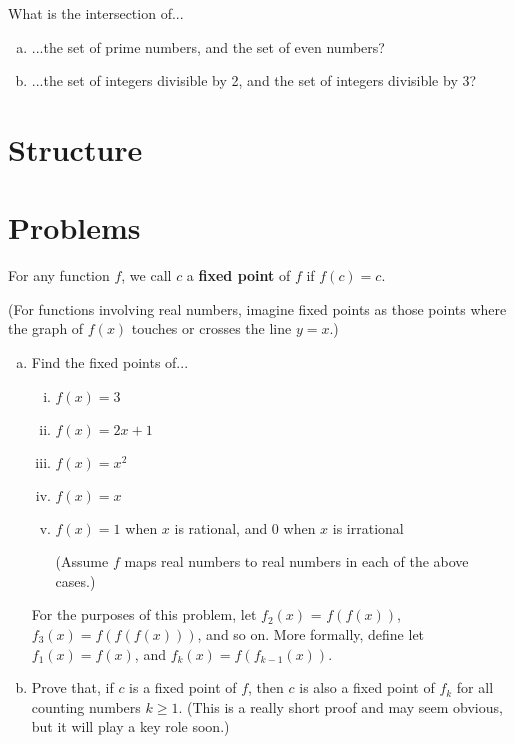 \begin{exercise}
What is the intersection of...
\begin{enumerate}[(a)]
\item ...the set of prime numbers, and the set of even numbers?
\item ...the set of integers divisible by 2, and the set of integers divisible by 3?
\end{enumerate}
\end{exercise}




\section{Structure}



\section{Problems}


\begin{problem}
\label{pr:fp-intro}
For any function $f$, we call $c$ a \textbf{fixed point} of $f$ if $f(c) = c$. 

(For functions involving real numbers, imagine fixed points as those points where the graph of $f(x)$ touches or crosses the line $y = x$.)


\begin{enumerate}[(a)]
\item Find the fixed points of... 
\begin{enumerate}[i.]
\item $f(x) = 3$
\item $f(x) = 2x + 1$
\item $f(x) = x^2$
\item $f(x) = x$
\item $f(x) = 1$ when $x$ is rational, and 0 when $x$ is irrational

(Assume $f$ maps real numbers to real numbers in each of the above cases.)
\end{enumerate}

For the purposes of this problem, let $f_2(x)$ = $f(f(x))$, $f_3(x) = f(f(f(x)))$, and so on. More formally, define let $f_1(x) = f(x)$, and $f_k(x) = f(f_{k-1}(x))$.

\item Prove that, if $c$ is a fixed point of $f$, then $c$ is also a fixed point of $f_k$ for all counting numbers $k \geq 1$. (This is a really short proof and may seem obvious, but it will play a key role soon.)
\end{enumerate}
\end{problem}

